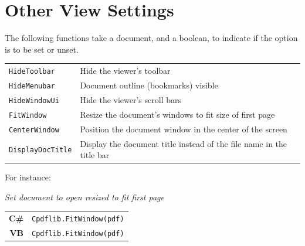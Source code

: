 \documentclass[a4paper]{memoir}
\begin{document}
\section{Other View Settings}
The following functions take a document, and a boolean, to indicate if the option is to be set or unset.
\begin{framed}
  \begin{tabular}{ll}
    \verb!HideToolbar! & \vspace{2mm} \parbox{8cm}{Hide the viewer's toolbar} \\
    \verb!HideMenubar! & \vspace{2mm} \parbox{8cm}{Document outline (bookmarks) visible} \\
    \verb!HideWindowUi! & \vspace{2mm} \parbox{8cm}{Hide the viewer's scroll bars} \\
    \verb!FitWindow! & \vspace{2mm} \parbox{8cm}{Resize the document's windows to fit size of first page} \\
    \verb!CenterWindow! & \vspace{2mm} \parbox{8cm}{Position the document window in the center of the screen} \\
    \verb!DisplayDocTitle! & \vspace{2mm} \parbox{8cm}{Display the document title instead of the file name in the title bar}
  \end{tabular}
\end{framed}
For instance:
\begin{framed}
\noindent\textit{Set document to open resized to fit first page}

\vspace{2mm}
\noindent\begin{tabular}{rl}
\small\sffamily\textbf{C\#} &
\begin{minipage}{4in}
\small\verb!Cpdflib.FitWindow(pdf)!
\end{minipage}\\[5mm]
\small\sffamily\textbf{VB} &
\begin{minipage}{4in}
\small\verb!Cpdflib.FitWindow(pdf)!
\end{minipage}\\[5mm]
\end{tabular}
\end{framed}
\end{document}
